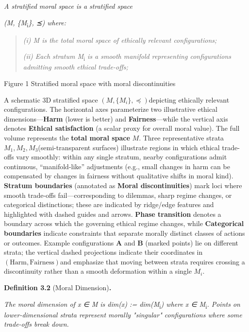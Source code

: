 \documentclass[12pt]{article}
\theoremstyle{plain}
\theoremstyle{definition}
\theoremstyle{remark}
\begin{document}
\emph{A stratified moral space is a stratified space}

\emph{(M, \{M}\textsubscript{i}\emph{\}, ⪯) where:}

\begin{quote}
\emph{(i) M is the total moral space of ethically relevant
configurations;}

\emph{(ii) Each stratum M}\textsubscript{i} \emph{is a smooth manifold
representing configurations admitting smooth ethical trade-offs;}
\end{quote}

Figure 1 \textbar{} Stratified moral space with moral discontinuities

A schematic 3D stratified space
\(\left( M,\{ M_{i}\}, \preceq \right)\)depicting ethically relevant
configurations. The horizontal axes parameterize two illustrative
ethical dimensions---\textbf{Harm} (lower is better) and
\textbf{Fairness}---while the vertical axis denotes \textbf{Ethical
satisfaction} (a scalar proxy for overall moral value). The full volume
represents the \textbf{total moral space} \(M\). Three representative
strata \(M_{1},M_{2},M_{3}\)(semi-transparent surfaces) illustrate
regions in which ethical trade-offs vary smoothly: within any single
stratum, nearby configurations admit continuous, ``manifold-like''
adjustments (e.g., small changes in harm can be compensated by changes
in fairness without qualitative shifts in moral kind). \textbf{Stratum
boundaries} (annotated as \textbf{Moral discontinuities}) mark loci
where smooth trade-offs fail---corresponding to dilemmas, sharp regime
changes, or categorical distinctions; these are indicated by ridge/edge
features and highlighted with dashed guides and arrows. \textbf{Phase
transition} denotes a boundary across which the governing ethical regime
changes, while \textbf{Categorical boundaries} indicate constraints that
separate morally distinct classes of actions or outcomes. Example
configurations \textbf{A} and \textbf{B} (marked points) lie on
different strata; the vertical dashed projections indicate their
coordinates in \(\left( \text{Harm},\text{Fairness} \right)\)and
emphasize that moving between strata requires crossing a discontinuity
rather than a smooth deformation within a single \(M_{i}\).

\textbf{Definition 3.2} (Moral Dimension)\textbf{.}

\emph{The moral dimension of x ∈ M is dim(x) :=
dim(M}\textsubscript{i}\emph{) where x ∈ M}\textsubscript{i}\emph{.
Points on lower-dimensional strata represent morally "singular"
configurations where some trade-offs break down.}
\end{document}
